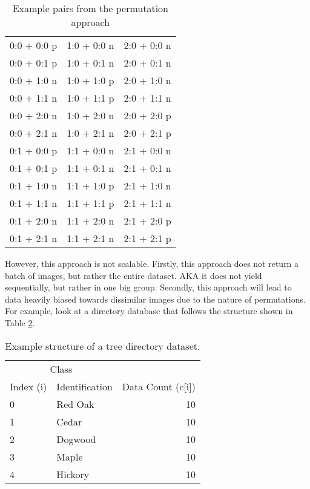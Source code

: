 \documentclass[
	letterpaper, %
	10pt, %
	unnumberedsections, %
	twoside, %
]{LTJournalArticle}
\begin{document}
\begin{table}[hbt!] %
	\caption{Example pairs from the permutation approach}
	\centering
	\begin{tabular}{c c c}
		\toprule
        0:0 + 0:0 p & 1:0 + 0:0 n & 2:0 + 0:0 n \\
        0:0 + 0:1 p & 1:0 + 0:1 n & 2:0 + 0:1 n \\
        0:0 + 1:0 n & 1:0 + 1:0 p & 2:0 + 1:0 n \\
        0:0 + 1:1 n & 1:0 + 1:1 p & 2:0 + 1:1 n \\
        0:0 + 2:0 n & 1:0 + 2:0 n & 2:0 + 2:0 p \\
        0:0 + 2:1 n & 1:0 + 2:1 n & 2:0 + 2:1 p \\
        0:1 + 0:0 p & 1:1 + 0:0 n & 2:1 + 0:0 n \\
        0:1 + 0:1 p & 1:1 + 0:1 n & 2:1 + 0:1 n \\
        0:1 + 1:0 n & 1:1 + 1:0 p & 2:1 + 1:0 n \\
        0:1 + 1:1 n & 1:1 + 1:1 p & 2:1 + 1:1 n \\
        0:1 + 2:0 n & 1:1 + 2:0 n & 2:1 + 2:0 p \\
        0:1 + 2:1 n & 1:1 + 2:1 n & 2:1 + 2:1 p \\
		\bottomrule
	\end{tabular}
	\label{tab:Example_Pairs}
\end{table}

However, this approach is not scalable. Firstly, this approach does not return a batch of images, but rather the entire dataset. AKA it does not yield sequentially, but rather in one big group.
Secondly, this approach will lead to data heavily biased towards dissimilar images due to the nature of permutations. For example, look at a directory database that follows the structure shown in Table \ref{tab:structure}.


\begin{table}[h!] %
	\caption{Example structure of a tree directory dataset.}
	\centering
	\begin{tabular}{l l r}
		\toprule
		\multicolumn{2}{c}{Class} \\
		\cmidrule(r){1-2}
		Index (i) & Identification & Data Count (c[i]) \\
		\midrule
		0 & Red Oak & 10 \\
		1 & Cedar & 10 \\
		2 & Dogwood & 10 \\
		3 & Maple & 10 \\
		4 & Hickory & 10 \\
		\bottomrule
	\end{tabular}
	\label{tab:structure}
\end{table}
\end{document}
